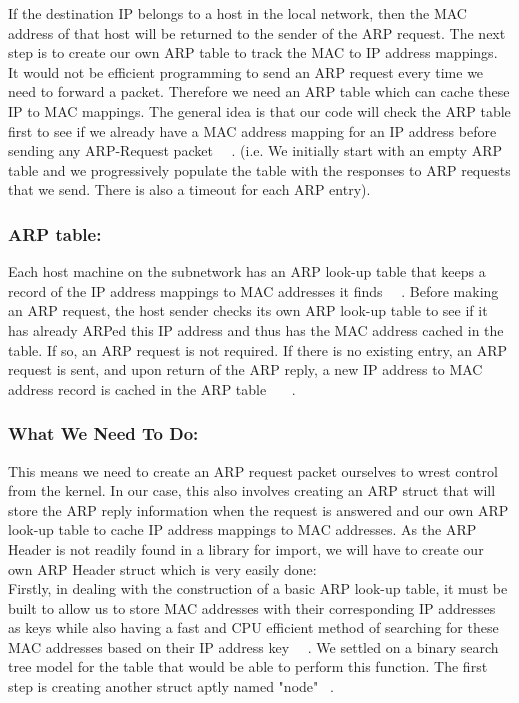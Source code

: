 If the destination IP belongs to a host in the local network, then the MAC address of that host will be returned to the sender of the ARP request. The next step is to create our own ARP table to track the MAC to IP address mappings. It would not be efficient programming to send an ARP request every time we need to forward a packet. Therefore we need an ARP table which can cache these IP to MAC mappings. The general idea is that our code will check the ARP table first to see if we already have a MAC address mapping for an IP address before sending any ARP-Request packet ~\cite{1}~\cite{2}. (i.e. We initially start with an empty ARP table and we progressively populate the table with the responses to ARP requests that we send. There is also a timeout for each ARP entry).

\subsubsection*{ARP table:}
Each host machine on the subnetwork has an ARP look-up table that keeps a record of the IP address mappings to MAC addresses it finds ~\cite{1}~\cite{41}. Before making an ARP request, the host sender checks its own ARP look-up table to see if it has already ARPed this IP address and thus has the MAC address cached in the table. If so, an ARP request is not required. If there is no existing entry, an ARP request is sent, and upon return of the ARP reply, a new IP address to MAC address record is cached in the ARP table ~\cite{1}~\cite{2}~\cite{41}.\\

\subsubsection*{What We Need To Do:}
This means we need to create an ARP request packet ourselves to wrest control from the kernel. In our case, this also involves creating an ARP struct that will store the ARP reply information when the request is answered and our own ARP look-up table to cache IP address mappings to MAC addresses. As the ARP Header is not readily found in a library for import, we will have to create our own ARP Header struct which is very easily done: \\

Firstly, in dealing with the construction of a basic ARP look-up table, it must be built to allow us to store MAC addresses with their corresponding IP addresses as keys while also having a fast and CPU efficient method of searching for these MAC addresses based on their IP address key ~\cite{1}~\cite{41}. We settled on a binary search tree model for the table that would be able to perform  this function. The first step is creating another struct aptly named "node" ~\cite{42}. \\

